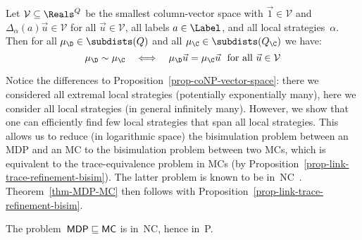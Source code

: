 \begin{cor}\label{cor-coNP-vector-space-MC}
Let $\mathcal{V} \subseteq \Reals^Q$ be the smallest column-vector space with $\vec{1} \in \mathcal{V}$ and $\Delta_\alpha(a) \vec{u} \in \mathcal{V}$ for all $\vec{u} \in \mathcal{V}$, all labels $a \in \Label$, and all local strategies~$\alpha$.
Then for all $\mu_\D \in \subdists(Q)$ and all $\mu_\C \in \subdists(Q_\C)$ we have:
\[
\mu_\D \sim \mu_\C \quad \Longleftrightarrow\quad \mu_\D \vec{u} = \mu_\C \vec{u}\ \text{ for all } \vec{u} \in \mathcal{V}
\]
\end{cor}

Notice the differences to Proposition~\ref{prop-coNP-vector-space}: there we considered all extremal local strategies (potentially exponentially many), here we consider all local strategies (in general infinitely many).
However, we show that one can efficiently find few local strategies that span all local strategies.
This allows us to reduce (in logarithmic space) the bisimulation problem between an MDP and an MC to the bisimulation problem between two MCs,
which is equivalent to the trace-equivalence problem in MCs (by Proposition~\ref{prop-link-trace-refinement-bisim}).
The latter problem is known to be in~{\sf NC}~\cite{Tzeng96}.
Theorem~\ref{thm-MDP-MC} then follows with Proposition~\ref{prop-link-trace-refinement-bisim}.

\begin{thm}\label{thm-MDP-MC}
The problem~${\sf MDP\sqsubseteq MC}$ is in~{\sf NC}, hence in~{\sf P}.
\end{thm}

